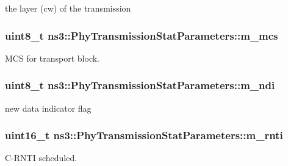 the layer (cw) of the transmission 

\subsubsection[{\texorpdfstring{m\+\_\+mcs}{m_mcs}}]{\setlength{\rightskip}{0pt plus 5cm}uint8\+\_\+t ns3\+::\+Phy\+Transmission\+Stat\+Parameters\+::m\+\_\+mcs}\hypertarget{structns3_1_1PhyTransmissionStatParameters_aefa800d4df4329d6715faea380a03c7e}{}\label{structns3_1_1PhyTransmissionStatParameters_aefa800d4df4329d6715faea380a03c7e}


M\+CS for transport block. 

\subsubsection[{\texorpdfstring{m\+\_\+ndi}{m_ndi}}]{\setlength{\rightskip}{0pt plus 5cm}uint8\+\_\+t ns3\+::\+Phy\+Transmission\+Stat\+Parameters\+::m\+\_\+ndi}\hypertarget{structns3_1_1PhyTransmissionStatParameters_a10c7161e27960de7d057b991d953f3f1}{}\label{structns3_1_1PhyTransmissionStatParameters_a10c7161e27960de7d057b991d953f3f1}


new data indicator flag 

\subsubsection[{\texorpdfstring{m\+\_\+rnti}{m_rnti}}]{\setlength{\rightskip}{0pt plus 5cm}uint16\+\_\+t ns3\+::\+Phy\+Transmission\+Stat\+Parameters\+::m\+\_\+rnti}\hypertarget{structns3_1_1PhyTransmissionStatParameters_a67a38610c5bdd69cacce60769ce26f38}{}\label{structns3_1_1PhyTransmissionStatParameters_a67a38610c5bdd69cacce60769ce26f38}


C-\/\+R\+N\+TI scheduled. 

